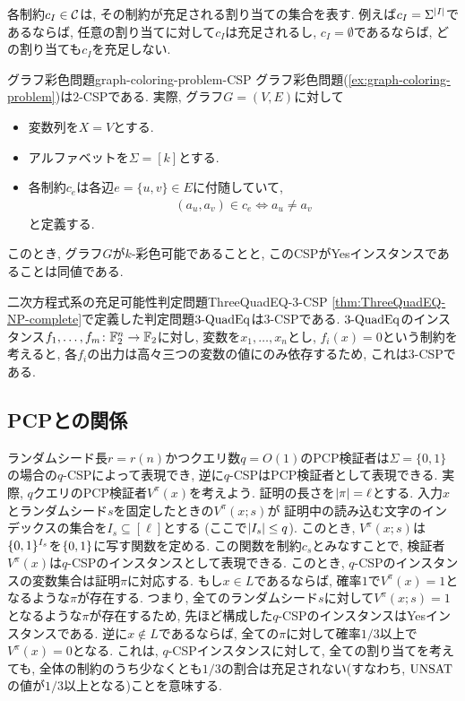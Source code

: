 各制約$c_I\in \mathcal{C}$は, その制約が充足される割り当ての集合を表す.
例えば$c_I = \Sigma^{\abs{I}}$であるならば, 任意の割り当てに対して$c_I$は充足されるし,
$c_I = \emptyset$であるならば, どの割り当ても$c_I$を充足しない.

\begin{example}{グラフ彩色問題}{graph-coloring-problem-CSP}
  グラフ彩色問題(\cref{ex:graph-coloring-problem})は$2$-CSPである.
  実際, グラフ$G=(V,E)$に対して
  \begin{itemize}
    \item 変数列を$X=V$とする.
    \item アルファベットを$\Sigma=[k]$とする.
    \item 各制約$c_e$は各辺$e=\{u,v\}\in E$に付随していて,
    \begin{align*}
      (a_u,a_v) \in c_e \iff a_u\ne a_v
    \end{align*}
  と定義する.
  \end{itemize}
  このとき, グラフ$G$が$k$-彩色可能であることと, このCSPがYesインスタンスであることは同値である.
\end{example}

\begin{example}{二次方程式系の充足可能性判定問題}{ThreeQuadEQ-3-CSP}
  \cref{thm:ThreeQuadEQ-NP-complete}で定義した判定問題$\text{3-QuadEq}$は$3$-CSPである.
  $\text{3-QuadEq}$のインスタンス$f_1,\dots,f_m\colon\mathbb{F}_2^n\to\mathbb{F}_2$に対し,
  変数を$x_1,\dots,x_n$とし, $f_i(x)=0$という制約を考えると, 各$f_i$の出力は高々三つの変数の値にのみ依存するため, これは$3$-CSPである.
\end{example}


\subsection{PCPとの関係}
ランダムシード長$r=r(n)$かつクエリ数$q=O(1)$のPCP検証者は$\Sigma=\{0,1\}$の場合の$q$-CSPによって表現でき, 逆に$q$-CSPはPCP検証者として表現できる.
実際, $q$クエリのPCP検証者$V^\pi(x)$を考えよう.
証明の長さを$\abs{\pi}=\ell$とする.
入力$x$とランダムシード$s$を固定したときの$V^\pi(x;s)$が
証明中の読み込む文字のインデックスの集合を$I_s\subseteq[\ell]$とする (ここで$\abs{I_s}\le q$).
このとき, $V^\pi(x;s)$は$\{0,1\}^{I_s}$を$\{0,1\}$に写す関数を定める.
この関数を制約$c_s$とみなすことで, 検証者$V^\pi(x)$は$q$-CSPのインスタンスとして表現できる.
このとき, $q$-CSPのインスタンスの変数集合は証明$\pi$に対応する.
もし$x\in L$であるならば, 確率$1$で$V^\pi(x)=1$となるような$\pi$が存在する.
つまり, 全てのランダムシード$s$に対して$V^\pi(x;s)=1$となるような$\pi$が存在するため,
先ほど構成した$q$-CSPのインスタンスはYesインスタンスである.
逆に$x\not\in L$であるならば, 全ての$\pi$に対して確率$1/3$以上で$V^\pi(x)=0$となる.
これは, $q$-CSPインスタンスに対して, 全ての割り当てを考えても, 全体の制約のうち少なくとも$1/3$の割合は充足されない(すなわち, $\mathrm{UNSAT}$の値が$1/3$以上となる)ことを意味する.


